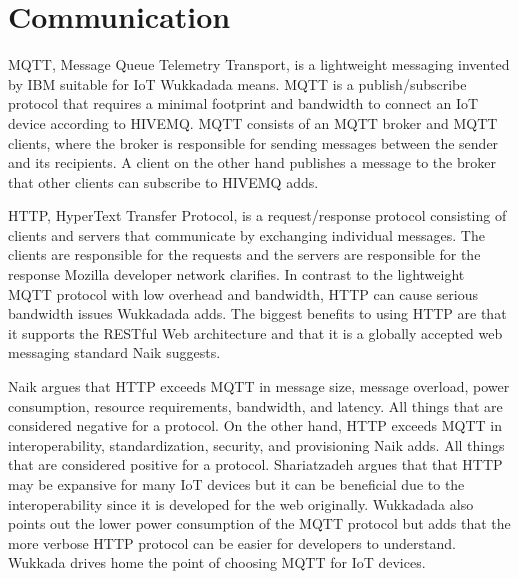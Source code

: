 \section{Communication} 
MQTT, Message Queue Telemetry Transport, is a lightweight messaging invented by IBM suitable for IoT Wukkadada means.\cite{Wukkadada2018} 
MQTT is a publish/subscribe protocol that requires a minimal footprint and bandwidth to connect an IoT device according to HIVEMQ.\cite{MQTT2021}
MQTT consists of an MQTT broker and MQTT clients, where the broker is responsible for sending messages between the sender and its recipients.\cite{Wukkadada2018}
A client on the other hand publishes a message to the broker that other clients can subscribe to HIVEMQ adds.\cite{MQTT2021}

HTTP, HyperText Transfer Protocol, is a request/response protocol consisting of clients and servers that communicate by exchanging individual messages. 
The clients are responsible for the requests and the servers are responsible for the response Mozilla developer network clarifies. \cite{HTTP2021} 
In contrast to the lightweight MQTT protocol with low overhead and bandwidth, HTTP can cause serious bandwidth issues Wukkadada adds. \cite{Wukkadada2018}
The biggest benefits to using HTTP are that it supports the RESTful Web architecture and that it is a globally accepted web messaging standard Naik suggests. \cite{Naik2017} 

Naik argues that HTTP exceeds MQTT in message size, message overload, power consumption, resource requirements, bandwidth, and latency. 
All things that are considered negative for a protocol.
On the other hand, HTTP exceeds MQTT in interoperability, standardization, security, and provisioning Naik adds.\cite{Naik2017}
All things that are considered positive for a protocol.
Shariatzadeh argues that that HTTP may be expansive for many IoT devices but it can be beneficial due to the interoperability since it is developed for the web originally.\cite{Shariatzadeh2016}
Wukkadada also points out the lower power consumption of the MQTT protocol but adds that the more verbose HTTP protocol can be easier for developers to understand.
Wukkada drives home the point of choosing MQTT for IoT devices.\cite{Wukkadada2018}
